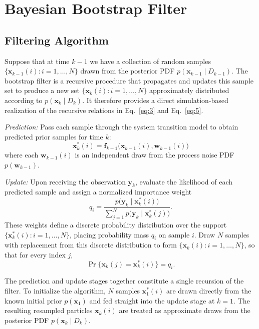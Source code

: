 \section{Bayesian Bootstrap Filter}\label{sec:bootstrap}

\subsection{Filtering Algorithm}\label{sec:alg}

Suppose that at time $k - 1$ we have a collection of random samples $\{\bm{x}_{k-1}(i) : i = 1, \dots, N\}$ drawn from the posterior PDF $p(\bm{x}_{k-1} \mid D_{k-1})$. The bootstrap filter is a recursive procedure that propagates and updates this sample set to produce a new set $\{\bm{x}_k(i) : i = 1, \dots, N\}$ approximately distributed according to $p(\bm{x}_k \mid D_k)$. It therefore provides a direct simulation-based realization of the recursive relations in Eq.~\eqref{eq:3} and Eq.~\eqref{eq:5}.

\emph{Prediction:} Pass each sample through the system transition model to obtain predicted prior samples for time $k$:
\begin{equation*}
\bm{x}_k^*(i) = \bm{f}_{k-1}\bigl(\bm{x}_{k-1}(i), \bm{w}_{k-1}(i)\bigr)
\end{equation*}
where each $\bm{w}_{k-1}(i)$ is an independent draw from the process noise PDF $p(\bm{w}_{k-1})$.

\emph{Update:} Upon receiving the observation $\bm{y}_k$, evaluate the likelihood of each predicted sample and assign a normalized importance weight
\begin{equation}\label{eq:8}
q_i = \frac{p\bigl(\bm{y}_k \mid \bm{x}_k^*(i)\bigr)}{\sum_{j=1}^N p\bigl(\bm{y}_k \mid \bm{x}_k^*(j)\bigr)}.
\end{equation}
These weights define a discrete probability distribution over the support $\{\bm{x}_k^*(i) : i = 1, \dots, N\}$, placing probability mass $q_i$ on sample $i$. Draw $N$ samples with replacement from this discrete distribution to form $\{\bm{x}_k(i) : i = 1, \dots, N\}$, so that for every index $j$,
\begin{equation*}
\Pr\bigl\{\bm{x}_k(j) = \bm{x}_k^*(i)\bigr\} = q_i.
\end{equation*}

The prediction and update stages together constitute a single recursion of the filter. To initialize the algorithm, $N$ samples $\bm{x}_1^*(i)$ are drawn directly from the known initial prior $p(\bm{x}_1)$ and fed straight into the update stage at $k = 1$. The resulting resampled particles $\bm{x}_k(i)$ are treated as approximate draws from the posterior PDF $p(\bm{x}_k \mid D_k)$.

